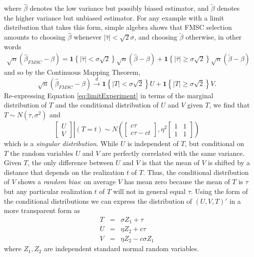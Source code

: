where $\widehat{\beta}$ denotes the low variance but possibly biased estimator, and $\widetilde{\beta}$ denotes the higher variance but unbiased estimator.
For any example with a limit distribution that takes this form, simple algebra shows that FMSC selection amounts to choosing $\widehat{\beta}$ whenever $|\widehat{\tau}|<\sqrt{2}\sigma$, and choosing $\widetilde{\beta}$ otherwise, in other words
\begin{eqnarray*}
  \sqrt{n}(\widehat{\beta}_{FMSC} - \beta) = \mathbf{1}\left\{ |\widehat{\tau}|<\sigma \sqrt{2} \right\} \sqrt{n}(\widehat{\beta} - \beta) +  \mathbf{1}\left\{ |\widehat{\tau}|\geq\sigma \sqrt{2} \right\}\sqrt{n}(\widetilde{\beta} - \beta)
\end{eqnarray*}
and so by the Continuous Mapping Theorem,
\begin{equation*}
  \sqrt{n}(\widehat{\beta}_{FMSC} - \beta) \overset{d}{\rightarrow}  \mathbf{1}\left\{ |T|<\sigma \sqrt{2} \right\} U +  \mathbf{1}\left\{ |T|\geq\sigma \sqrt{2} \right\} V.
\end{equation*}
Re-expressing Equation \ref{eq:limitExperiment} in terms of the marginal distribution of $T$ and the conditional distribution of $U$ and $V$ given $T$, we find that $T \sim N(\tau, \sigma^2)$ and 
\begin{equation*}
  \left.\left[
  \begin{array}{c}
   U \\ V 
  \end{array}
\right]\right| (T = t) \sim N\left(
\left[
\begin{array}{c}
  c \tau \\ c\tau - ct
\end{array}
\right], \eta^2
\left[
\begin{array}{cc}
  1 & 1 \\ 1 & 1
\end{array}
\right]
\right)
\end{equation*}
which is a \emph{singular distribution}.
While $U$ is independent of $T$, but conditional on $T$ the random variables $U$ and $V$ are perfectly correlated with the same variance.
Given $T$, the only difference between $U$ and $V$ is that the mean of $V$ is shifted by a distance that depends on the realization $t$ of $T$.
Thus, the conditional distribution of $V$ shows a \emph{random bias}: on average $V$ has mean zero because the mean of $T$ is $\tau$ but any particular realization $t$ of $T$ will not in general equal $\tau$.
Using the form of the conditional distributions we can express the distribution of $(U,V,T)'$ in a more transparent form as
\begin{eqnarray*}
  T &=& \sigma Z_1 + \tau\\
  U &=& \eta Z_2 + c\tau\\
  V &=& \eta Z_2 - c\sigma Z_1
\end{eqnarray*}
where $Z_1, Z_2$ are independent standard normal random variables.
